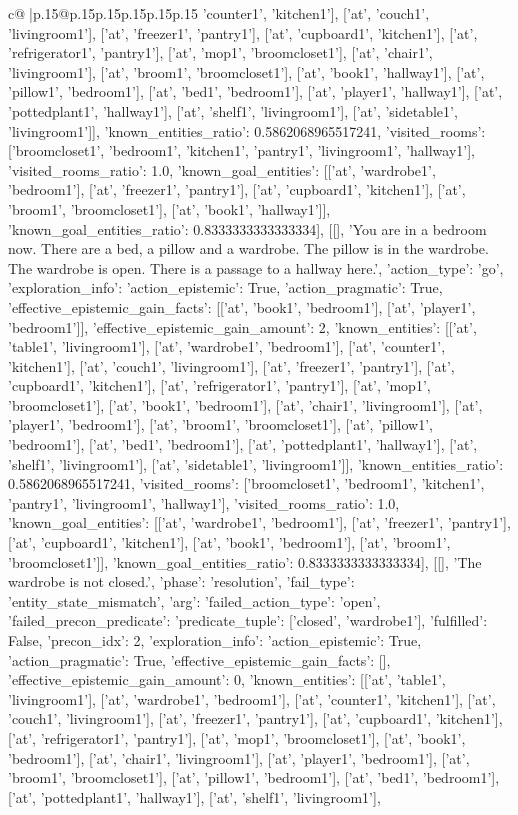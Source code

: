 \documentclass{article}
\begin{document}
{\begin{supertabular}{c@{$\;$}|p{.15\linewidth}@{}p{.15\linewidth}p{.15\linewidth}p{.15\linewidth}p{.15\linewidth}p{.15\linewidth}}
{{{'counter1', 'kitchen1'], ['at', 'couch1', 'livingroom1'], ['at', 'freezer1', 'pantry1'], ['at', 'cupboard1', 'kitchen1'], ['at', 'refrigerator1', 'pantry1'], ['at', 'mop1', 'broomcloset1'], ['at', 'chair1', 'livingroom1'], ['at', 'broom1', 'broomcloset1'], ['at', 'book1', 'hallway1'], ['at', 'pillow1', 'bedroom1'], ['at', 'bed1', 'bedroom1'], ['at', 'player1', 'hallway1'], ['at', 'pottedplant1', 'hallway1'], ['at', 'shelf1', 'livingroom1'], ['at', 'sidetable1', 'livingroom1']], 'known_entities_ratio': 0.5862068965517241, 'visited_rooms': ['broomcloset1', 'bedroom1', 'kitchen1', 'pantry1', 'livingroom1', 'hallway1'], 'visited_rooms_ratio': 1.0, 'known_goal_entities': [['at', 'wardrobe1', 'bedroom1'], ['at', 'freezer1', 'pantry1'], ['at', 'cupboard1', 'kitchen1'], ['at', 'broom1', 'broomcloset1'], ['at', 'book1', 'hallway1']], 'known_goal_entities_ratio': 0.8333333333333334}}], [[], 'You are in a bedroom now. There are a bed, a pillow and a wardrobe. The pillow is in the wardrobe. The wardrobe is open. There is a passage to a hallway here.', {'action_type': 'go', 'exploration_info': {'action_epistemic': True, 'action_pragmatic': True, 'effective_epistemic_gain_facts': [['at', 'book1', 'bedroom1'], ['at', 'player1', 'bedroom1']], 'effective_epistemic_gain_amount': 2, 'known_entities': [['at', 'table1', 'livingroom1'], ['at', 'wardrobe1', 'bedroom1'], ['at', 'counter1', 'kitchen1'], ['at', 'couch1', 'livingroom1'], ['at', 'freezer1', 'pantry1'], ['at', 'cupboard1', 'kitchen1'], ['at', 'refrigerator1', 'pantry1'], ['at', 'mop1', 'broomcloset1'], ['at', 'book1', 'bedroom1'], ['at', 'chair1', 'livingroom1'], ['at', 'player1', 'bedroom1'], ['at', 'broom1', 'broomcloset1'], ['at', 'pillow1', 'bedroom1'], ['at', 'bed1', 'bedroom1'], ['at', 'pottedplant1', 'hallway1'], ['at', 'shelf1', 'livingroom1'], ['at', 'sidetable1', 'livingroom1']], 'known_entities_ratio': 0.5862068965517241, 'visited_rooms': ['broomcloset1', 'bedroom1', 'kitchen1', 'pantry1', 'livingroom1', 'hallway1'], 'visited_rooms_ratio': 1.0, 'known_goal_entities': [['at', 'wardrobe1', 'bedroom1'], ['at', 'freezer1', 'pantry1'], ['at', 'cupboard1', 'kitchen1'], ['at', 'book1', 'bedroom1'], ['at', 'broom1', 'broomcloset1']], 'known_goal_entities_ratio': 0.8333333333333334}}], [[], 'The wardrobe is not closed.', {'phase': 'resolution', 'fail_type': 'entity_state_mismatch', 'arg': {'failed_action_type': 'open', 'failed_precon_predicate': {'predicate_tuple': ['closed', 'wardrobe1'], 'fulfilled': False, 'precon_idx': 2}}, 'exploration_info': {'action_epistemic': True, 'action_pragmatic': True, 'effective_epistemic_gain_facts': [], 'effective_epistemic_gain_amount': 0, 'known_entities': [['at', 'table1', 'livingroom1'], ['at', 'wardrobe1', 'bedroom1'], ['at', 'counter1', 'kitchen1'], ['at', 'couch1', 'livingroom1'], ['at', 'freezer1', 'pantry1'], ['at', 'cupboard1', 'kitchen1'], ['at', 'refrigerator1', 'pantry1'], ['at', 'mop1', 'broomcloset1'], ['at', 'book1', 'bedroom1'], ['at', 'chair1', 'livingroom1'], ['at', 'player1', 'bedroom1'], ['at', 'broom1', 'broomcloset1'], ['at', 'pillow1', 'bedroom1'], ['at', 'bed1', 'bedroom1'], ['at', 'pottedplant1', 'hallway1'], ['at', 'shelf1', 'livingroom1'], }}}
\end{supertabular}}
\end{document}
